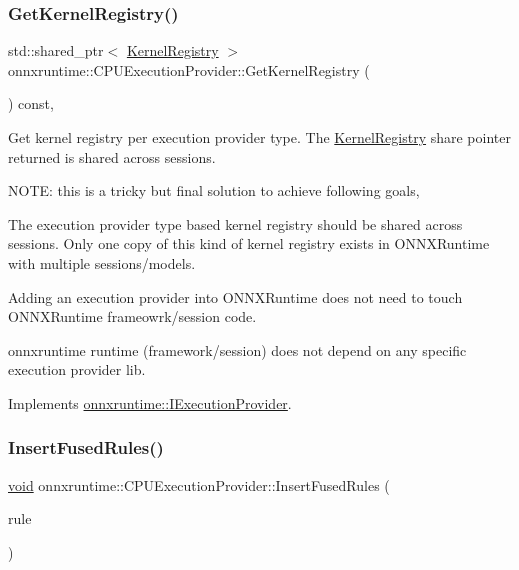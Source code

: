 \subsubsection{\texorpdfstring{Get\+Kernel\+Registry()}{GetKernelRegistry()}}
{\footnotesize\ttfamily std\+::shared\+\_\+ptr$<$ \mbox{\hyperlink{classonnxruntime_1_1KernelRegistry}{Kernel\+Registry}} $>$ onnxruntime\+::\+C\+P\+U\+Execution\+Provider\+::\+Get\+Kernel\+Registry (\begin{DoxyParamCaption}{ }\end{DoxyParamCaption}) const\hspace{0.3cm}{\ttfamily [override]}, {\ttfamily [virtual]}}

Get kernel registry per execution provider type. The \mbox{\hyperlink{classonnxruntime_1_1KernelRegistry}{Kernel\+Registry}} share pointer returned is shared across sessions.

N\+O\+TE\+: this is a tricky but final solution to achieve following goals,
\begin{DoxyEnumerate}
\item The execution provider type based kernel registry should be shared across sessions. Only one copy of this kind of kernel registry exists in O\+N\+N\+X\+Runtime with multiple sessions/models.
\item Adding an execution provider into O\+N\+N\+X\+Runtime does not need to touch O\+N\+N\+X\+Runtime frameowrk/session code.
\item onnxruntime runtime (framework/session) does not depend on any specific execution provider lib. 
\end{DoxyEnumerate}

Implements \mbox{\hyperlink{classonnxruntime_1_1IExecutionProvider_a83caf9a8da9fcbc4e7fdc891055d664d}{onnxruntime\+::\+I\+Execution\+Provider}}.

\mbox{\label{classonnxruntime_1_1CPUExecutionProvider_a38dfe044189eae1bc32675a064a487fa}} 
\subsubsection{\texorpdfstring{Insert\+Fused\+Rules()}{InsertFusedRules()}}
{\footnotesize\ttfamily \mbox{\hyperlink{mlasi_8h_a88f941d423cb2a819b70a1358982b1a6}{void}} onnxruntime\+::\+C\+P\+U\+Execution\+Provider\+::\+Insert\+Fused\+Rules (\begin{DoxyParamCaption}\item[{\mbox{\hyperlink{namespaceonnxruntime_a916d9c71f5b38a56c21340f816954b88}{Fuse\+Rule\+Fn}}}]{rule }\end{DoxyParamCaption})}

